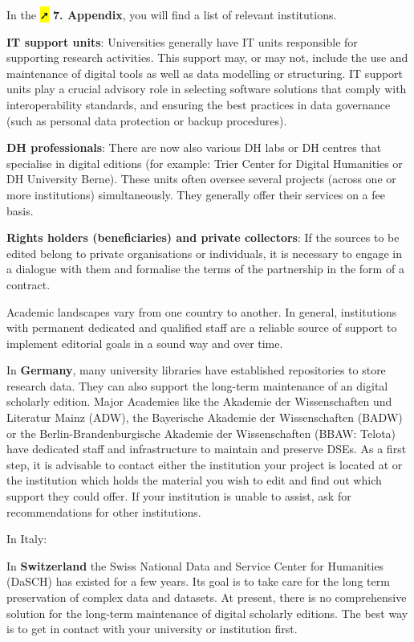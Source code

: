 \documentclass[
  letterpaper,
  DIV=11,
  numbers=noendperiod]{scrreprt}
\begin{document}
In the \hl{➚} \textbf{7. Appendix}, you will find a list of relevant
institutions.

\textbf{IT support units}: Universities generally have IT units
responsible for supporting research activities. This support may, or may
not, include the use and maintenance of digital tools as well as data
modelling or structuring. IT support units play a crucial advisory role
in selecting software solutions that comply with interoperability
standards, and ensuring the best practices in data governance (such as
personal data protection or backup procedures).

\textbf{DH professionals}: There are now also various DH labs or DH
centres that specialise in digital editions (for example: Trier Center
for Digital Humanities or DH University Berne). These units often
oversee several projects (across one or more institutions)
simultaneously. They generally offer their services on a fee basis.

\textbf{Rights holders (beneficiaries) and private collectors}: If the
sources to be edited belong to private organisations or individuals, it
is necessary to engage in a dialogue with them and formalise the terms
of the partnership in the form of a contract.

Academic landscapes vary from one country to another. In general,
institutions with permanent dedicated and qualified staff are a reliable
source of support to implement editorial goals in a sound way and over
time.

In \textbf{Germany}, many university libraries have established
repositories to store research data. They can also support the long-term
maintenance of an digital scholarly edition. Major Academies like the
Akademie der Wissenschaften und Literatur Mainz (ADW), the Bayerische
Akademie der Wissenschaften (BADW) or the Berlin-Brandenburgische
Akademie der Wissenschaften (BBAW: Telota) have dedicated staff and
infrastructure to maintain and preserve DSEs. As a first step, it is
advisable to contact either the institution your project is located at
or the institution which holds the material you wish to edit and find
out which support they could offer. If your institution is unable to
assist, ask for recommendations for other institutions.

In Italy:

In \textbf{Switzerland} the Swiss National Data and Service Center for
Humanities (DaSCH) has existed for a few years. Its goal is to take care
for the long term preservation of complex data and datasets. At present,
there is no comprehensive solution for the long-term maintenance of
digital scholarly editions. The best way is to get in contact with your
university or institution first.
\end{document}
